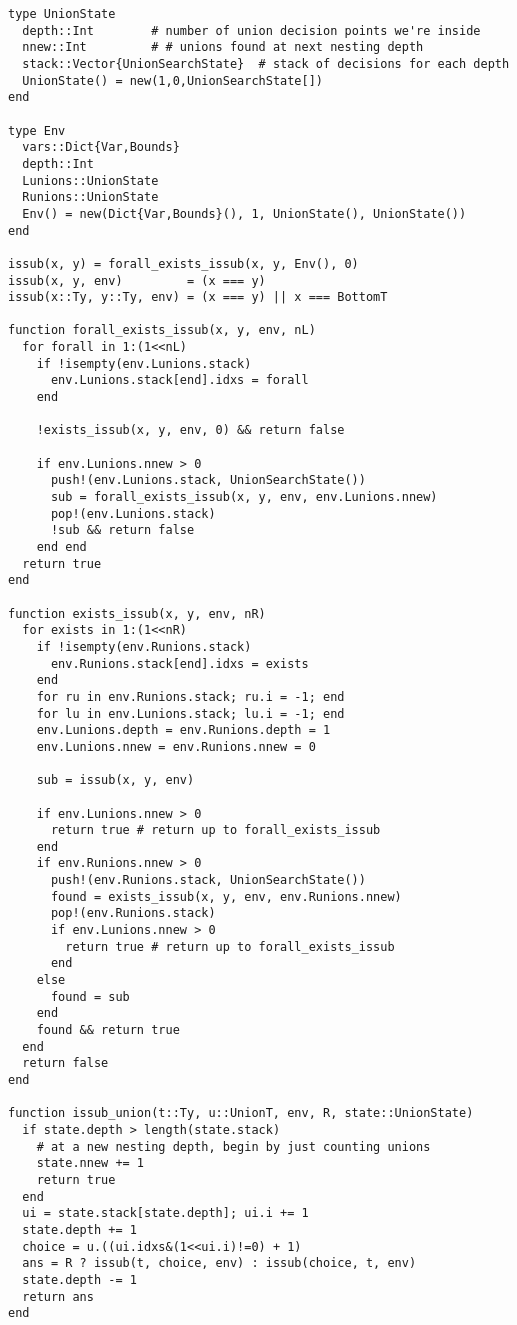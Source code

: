 \begin{singlespace}
\begin{lstlisting}[style=customjulia]
type UnionState
  depth::Int        # number of union decision points we're inside
  nnew::Int         # # unions found at next nesting depth
  stack::Vector{UnionSearchState}  # stack of decisions for each depth
  UnionState() = new(1,0,UnionSearchState[])
end

type Env
  vars::Dict{Var,Bounds}
  depth::Int
  Lunions::UnionState
  Runions::UnionState
  Env() = new(Dict{Var,Bounds}(), 1, UnionState(), UnionState())
end

issub(x, y) = forall_exists_issub(x, y, Env(), 0)
issub(x, y, env)         = (x === y)
issub(x::Ty, y::Ty, env) = (x === y) || x === BottomT

function forall_exists_issub(x, y, env, nL)
  for forall in 1:(1<<nL)
    if !isempty(env.Lunions.stack)
      env.Lunions.stack[end].idxs = forall
    end

    !exists_issub(x, y, env, 0) && return false

    if env.Lunions.nnew > 0
      push!(env.Lunions.stack, UnionSearchState())
      sub = forall_exists_issub(x, y, env, env.Lunions.nnew)
      pop!(env.Lunions.stack)
      !sub && return false
    end end
  return true
end

function exists_issub(x, y, env, nR)
  for exists in 1:(1<<nR)
    if !isempty(env.Runions.stack)
      env.Runions.stack[end].idxs = exists
    end
    for ru in env.Runions.stack; ru.i = -1; end
    for lu in env.Lunions.stack; lu.i = -1; end
    env.Lunions.depth = env.Runions.depth = 1
    env.Lunions.nnew = env.Runions.nnew = 0

    sub = issub(x, y, env)

    if env.Lunions.nnew > 0
      return true # return up to forall_exists_issub
    end
    if env.Runions.nnew > 0
      push!(env.Runions.stack, UnionSearchState())
      found = exists_issub(x, y, env, env.Runions.nnew)
      pop!(env.Runions.stack)
      if env.Lunions.nnew > 0
        return true # return up to forall_exists_issub
      end
    else
      found = sub
    end
    found && return true
  end
  return false
end

function issub_union(t::Ty, u::UnionT, env, R, state::UnionState)
  if state.depth > length(state.stack)
    # at a new nesting depth, begin by just counting unions
    state.nnew += 1
    return true
  end
  ui = state.stack[state.depth]; ui.i += 1
  state.depth += 1
  choice = u.((ui.idxs&(1<<ui.i)!=0) + 1)
  ans = R ? issub(t, choice, env) : issub(choice, t, env)
  state.depth -= 1
  return ans
end


\end{lstlisting}
\end{singlespace}
